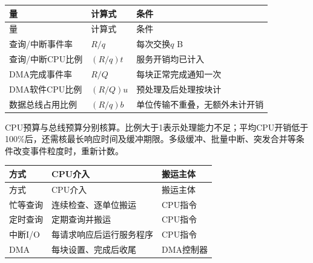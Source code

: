 \par\smallskip
{\fontsize{9.3}{12}\selectfont\setlength{\tabcolsep}{2.5pt}\setlength{\LTleft}{0pt}\setlength{\LTright}{0pt}
\begin{longtable}{@{}>{\raggedright\arraybackslash}p{}>{\raggedright\arraybackslash}p{}>{\raggedright\arraybackslash}p{}@{}}
\toprule
量 & 计算式 & 条件 \\

\midrule\endfirsthead\toprule
量 & 计算式 & 条件 \\

\midrule\endhead\bottomrule\endfoot
查询/中断事件率 & \(R/q\) & 每次交换\(q\) B \\

查询/中断CPU比例 & \((R/q)t\) & 服务开销均已计入 \\

DMA完成事件率 & \(R/Q\) & 每块正常完成通知一次 \\

DMA软件CPU比例 & \((R/Q)u\) & 预处理及后处理按块计 \\

数据总线占用比例 & \((R/q)b\) & 单位传输不重叠，无额外未计开销 \\

\end{longtable}}
\par\smallskip

CPU预算与总线预算分别核算。比例大于1表示处理能力不足；平均CPU开销低于100\%后，还需核最长响应时间及缓冲期限。多级缓冲、批量中断、突发合并等条件改变事件粒度时，重新计数。

\par\smallskip
{\fontsize{9.3}{12}\selectfont\setlength{\tabcolsep}{2.5pt}\setlength{\LTleft}{0pt}\setlength{\LTright}{0pt}
\begin{longtable}{@{}>{\raggedright\arraybackslash}p{}>{\raggedright\arraybackslash}p{}>{\raggedright\arraybackslash}p{}@{}}
\toprule
方式 & CPU介入 & 搬运主体 \\

\midrule\endfirsthead\toprule
方式 & CPU介入 & 搬运主体 \\

\midrule\endhead\bottomrule\endfoot
忙等查询 & 连续检查、逐单位搬运 & CPU指令 \\

定时查询 & 定期查询并搬运 & CPU指令 \\

中断I/O & 每请求响应后运行服务程序 & CPU指令 \\

DMA & 每块设置、完成后收尾 & DMA控制器 \\

\end{longtable}}
\par\smallskip

